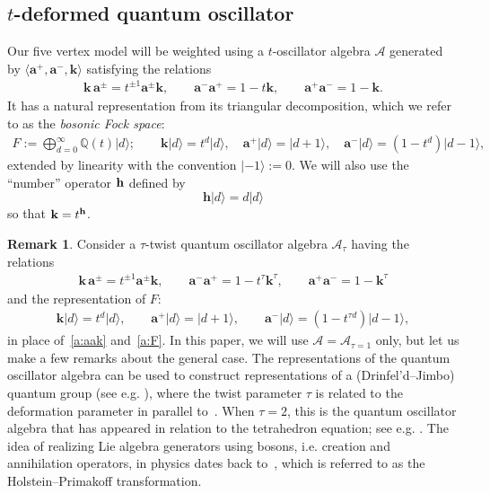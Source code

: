 \documentclass[11pt]{article}
\theoremstyle{definition}
\newtheorem{rema}[theo]{Remark}
\numberwithin{equation}{section}
\newcommand{\Q}{{\mathbb Q}}
\newcommand{\ket}[1]{\lvert #1 \rangle}
\newcommand{\aaa}{\mathbf{a}}
\newcommand{\hh}{\mathbf{h}}
\newcommand{\kk}{\mathbf{k}}
\newcommand{\qoa}{\mathcal{A}}
\newcommand{\defn}[1]{{\color{blue}\emph{#1}}}
\begin{document}
\subsection{\texorpdfstring{$t$}{t}-deformed quantum oscillator}
Our five vertex model will be weighted using a $t$-oscillator algebra $\qoa$ 
generated by $\langle \aaa^+, \aaa^-, \kk \rangle$ satisfying the relations
\begin{align}\label{a:aak}
\kk \,\aaa^{\pm} = t^{\pm 1} \aaa^{\pm} \kk,
\qquad
\aaa^- \aaa^+ = 1 - t \kk,
\qquad
\aaa^+ \aaa^- = 1 - \kk.
\end{align}
It has a natural representation from its triangular decomposition, which we refer to as the \defn{bosonic Fock space}:
\begin{align}\label{a:F}
F := \bigoplus_{d=0}^{\infty} \Q(t) \ket{d};
\qquad
\kk \ket{d} = t^d \ket{d},
\quad
\aaa^+ \ket{d} = \ket{d+1},
\quad
\aaa^- \ket{d} = (1 - t^d) \ket{d-1},
\end{align}
extended by linearity with the convention $\ket{-1} := 0$.
We will also use the ``number'' operator $\bf{h}$ defined by 
\begin{equation}\label{a:h}
\hh|d\rangle = d | d\rangle
\end{equation}
so that ${\bf k}= t^\hh$.
%

\begin{rema}\label{a:re:tau}
Consider a $\tau$-twist quantum oscillator algebra  
$\qoa_{\tau}$ having the relations
\begin{align}\label{a:aakt}
\kk \,\aaa^{\pm} = t^{\pm 1} \aaa^{\pm} \kk,
\qquad
\aaa^- \aaa^+ = 1 - t^{\tau} \kk^{\tau},
\qquad
\aaa^+ \aaa^- = 1 - \kk^{\tau}
\end{align}
and the representation of $F$:
\begin{align}\label{a:Ft}
\kk \ket{d} = t^d \ket{d},
\qquad
\aaa^+ \ket{d} = \ket{d+1},
\qquad
\aaa^- \ket{d} = (1 - t^{\tau d}) \ket{d-1},
\end{align}
in place of~\eqref{a:aak} and~\eqref{a:F}.
In this paper, we will use $\qoa=\qoa_{\tau = 1}$ only, but let us make a few remarks about the general case.
The representations of the quantum oscillator algebra can be used 
to construct representations of a (Drinfel'd--Jimbo) quantum group (see e.g. \cite{Hayashi90,K22}), 
where the twist parameter $\tau$ is related to the deformation parameter in parallel to~\cite{AS24}.
When $\tau = 2$, this is the quantum oscillator algebra that has appeared in relation to the tetrahedron equation; see e.g. \cite{KMO2,K22}.
The idea of realizing Lie algebra generators using bosons, i.e. creation and annihilation operators, in physics 
dates back to~\cite{HP}, which is referred to as the Holstein--Primakoff transformation.
\end{rema}
\end{document}
